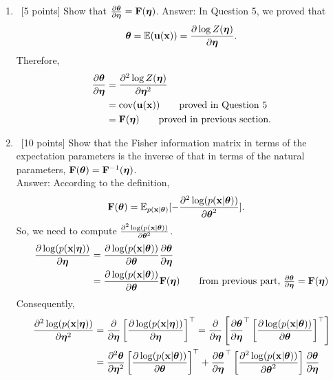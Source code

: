 \documentclass[12pt, fullpage,letterpaper]{article}
\def\red{\color{red}}
\def\blackblue{\color{black!40!blue}}
\begin{document}
\begin{enumerate}
\begin{enumerate}
	\item~[5 points] Show that $\frac{\partial \boldsymbol{\theta}}{\partial \boldsymbol{\eta}} = {\bf F}(\boldsymbol{\eta})$. 
	{\red Answer: }{\blackblue 
	In Question 5, we proved that 
	\begin{align*}
	\boldsymbol{\theta} 
	 =  \mathbb{E}({\bf u}({\bf x}))
	 =\frac{\partial \log Z(\boldsymbol{\eta})}{\partial \boldsymbol{\eta}}.
	\end{align*}
	Therefore, 
	\begin{align*}
	\frac{\partial \boldsymbol{\theta}}{\partial \boldsymbol{\eta}}  
	& = \frac{\partial^2 \log Z(\boldsymbol{\eta})}{\partial \boldsymbol{\eta}^2}\\ 
	& = \mathrm{cov}({\bf u}({\bf x})) \quad\quad\mbox{proved in Question 5}\\
	& = {\bf F}(\boldsymbol{\eta}) \quad\quad\mbox{proved in previous section.}
	\end{align*}
	}
	\item~[10 points] Show that the Fisher information matrix in terms of the expectation parameters is the inverse of that in terms of the natural parameters, ${\bf F}(\boldsymbol{\theta}) ={\bf F}^{-1}(\boldsymbol{\eta})$.\\
	{\red Answer: }{\blackblue 
	According to the definition, 
	\begin{align*}
	{\bf F}(\boldsymbol{\theta}) & = \mathbb{E}_{p({\bf x}|\boldsymbol{\theta})}[- \frac{\partial^2 \log(p({\bf x}|\boldsymbol{\theta})) }{\partial \boldsymbol{\theta}^2}].
	\end{align*}
	So, we need to compute $\frac{\partial^2 \log(p({\bf x}|\boldsymbol{\theta})) }{\partial \boldsymbol{\theta}^2}$.
	\begin{align*}
	\frac{\partial \log(p({\bf x}|\boldsymbol{\eta})) }{\partial \boldsymbol{\eta}} 
	& = \frac{\partial \log(p({\bf x}|\boldsymbol{\theta})) }{\partial \boldsymbol{\theta}} \frac{\partial \boldsymbol{\theta}}{\partial \boldsymbol{\eta}}\\
	& =  \frac{\partial \log(p({\bf x}|\boldsymbol{\theta})) }{\partial \boldsymbol{\theta}} {\bf F}(\boldsymbol{\eta})\quad\quad\mbox{from previous part, $\frac{\partial \boldsymbol{\theta}}{\partial \boldsymbol{\eta}}={\bf F}(\boldsymbol{\eta})$}
	\end{align*}
	Consequently, 
	\begin{align*}
	\frac{\partial^2 \log(p(\x|\boldeta)) }{\partial \boldeta^2} 
	 & = \frac{\partial}{\partial \boldeta}\left[\frac{\partial \log(p(\x|\boldeta)) }{\partial \boldeta}\right]^\top 
	= \frac{\partial}{\partial \boldeta}\left[\frac{\partial \btheta}{\partial \boldeta}^\top\left[\frac{\partial \log(p(\x|\btheta))}{\partial \btheta}\right]^\top \right]\\
	& = \frac{\partial^2 \btheta}{\partial \boldeta^2}\left[\frac{\partial \log(p(\x|\btheta))}{\partial \btheta}\right]^\top
	+ \frac{\partial \btheta}{\partial \boldeta}^\top\left[\frac{\partial^2 \log(p(\x|\btheta)) }{\partial \btheta^2}\right]\frac{\partial \btheta}{\partial \boldeta}\\

\end{align*}}
\end{enumerate}
\end{enumerate}
\end{document}
